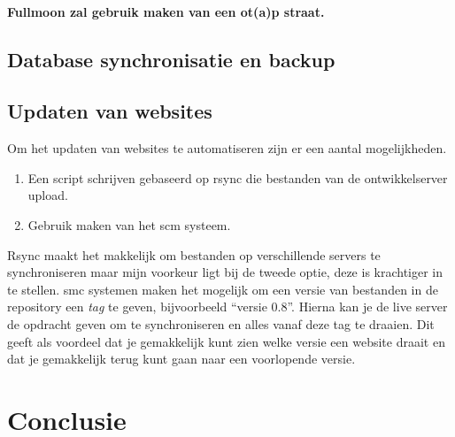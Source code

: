 \documentclass[12pt,a4paper]{article}
\begin{document}
    \paragraph{Fullmoon zal gebruik maken van een {\sc ot(a)p} straat.}
    
    \subsection{Database synchronisatie en backup}
    
    
    
    \subsection{Updaten van websites}
  
    Om het updaten van websites te automatiseren zijn er een aantal mogelijkheden. 
    
    \begin{enumerate}
      \item Een script schrijven gebaseerd op {\sc rsync} die bestanden van de ontwikkelserver upload.
      \item Gebruik maken van het {\sc scm} systeem.
    \end{enumerate}
    
    Rsync maakt het makkelijk om bestanden op verschillende servers te synchroniseren maar mijn voorkeur ligt bij de tweede optie, deze is krachtiger in te stellen.
    {\sc smc} systemen maken het mogelijk om een versie van bestanden in de repository een \emph{tag} te geven, bijvoorbeeld ``versie 0.8''. Hierna kan je de live server de opdracht geven om te synchroniseren en alles vanaf deze tag te draaien. Dit geeft als voordeel dat je gemakkelijk kunt zien welke versie een website draait en dat je gemakkelijk terug kunt gaan naar een voorlopende versie.
    
  \section{Conclusie}
\end{document}
